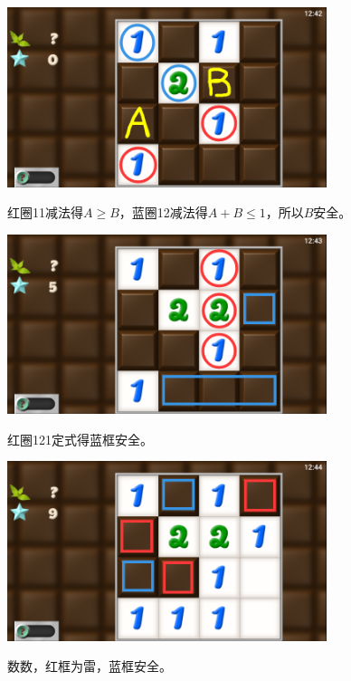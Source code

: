 \subsection{} %
\begin{center}
    \includegraphics[width=0.7\textwidth]{puzzle/133-1.png}
\end{center}
红圈11减法得$A\ge B$，蓝圈12减法得$A+B\le 1$，所以$B$安全。
\begin{center}
    \includegraphics[width=0.7\textwidth]{puzzle/133-2.png}
\end{center}
红圈121定式得蓝框安全。
\begin{center}
    \includegraphics[width=0.7\textwidth]{puzzle/133-3.png}
\end{center}
数数，红框为雷，蓝框安全。

